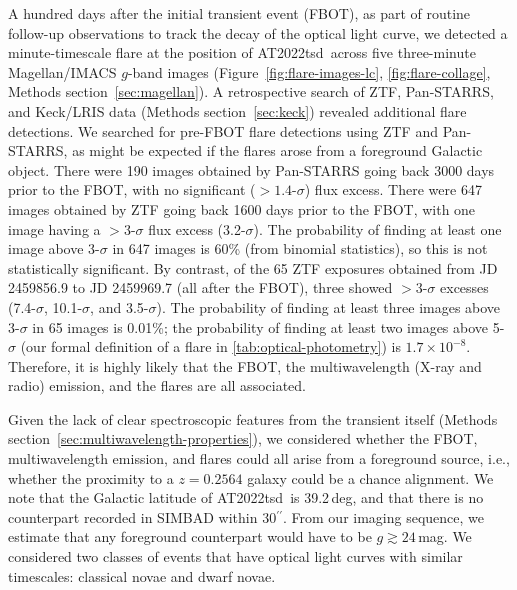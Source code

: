 \documentclass{nature_plusfigure}
\newcommand{\at}{AT2022tsd}
\newcommand{\arcsec}{$^{\prime\prime}$}
\begin{document}
\begin{methods}
A hundred days after the initial transient event (FBOT), as part of routine follow-up observations to track the decay of the optical light curve, we detected\cite{Ho2022_Flares} a minute-timescale flare at the position of \at\ across five three-minute Magellan/IMACS $g$-band images (Figure~\ref{fig:flare-images-lc}, \ref{fig:flare-collage}, Methods section~\ref{sec:magellan}). A retrospective search of ZTF, Pan-STARRS, and Keck/LRIS data (Methods section~\ref{sec:keck}) revealed additional flare detections. We searched for pre-FBOT flare detections using ZTF and Pan-STARRS, as might be expected if the flares arose from a foreground Galactic object. There were 190 images obtained by Pan-STARRS going back 3000 days prior to the FBOT, with no significant ($>1.4$-$\sigma$) flux excess\cite{Fulton2022}. There were 647 images obtained by ZTF going back 1600 days prior to the FBOT, with one image having a $>3$-$\sigma$ flux excess (3.2-$\sigma$). The probability of finding at least one image above 3-$\sigma$ in 647 images is 60\% (from binomial statistics), so this is not statistically significant. By contrast, of the 65 ZTF exposures obtained from JD 2459856.9 to JD 2459969.7 (all after the FBOT), three showed $>3$-$\sigma$ excesses (7.4-$\sigma$, 10.1-$\sigma$, and 3.5-$\sigma$). The probability of finding at least three images above 3-$\sigma$ in 65 images is 0.01\%; the probability of finding at least two images above 5-$\sigma$ (our formal definition of a flare in \ref{tab:optical-photometry}) is $1.7\times10^{-8}$. Therefore, it is highly likely that the FBOT, the multiwavelength (X-ray and radio) emission, and the flares are all associated. 


Given the lack of clear spectroscopic features from the transient itself (Methods section~\ref{sec:multiwavelength-properties}), we considered whether the FBOT, multiwavelength emission, and flares could all arise from a foreground source, i.e., whether the proximity to a $z=0.2564$ galaxy could be a chance alignment. 
We note that the Galactic latitude of \at\ is 39.2\,deg, and that there is no counterpart recorded in SIMBAD within 30\arcsec. From our imaging sequence, we estimate that any foreground counterpart would have to be $g \gtrsim 24\,$mag. We considered two classes of events that have optical light curves with similar timescales: classical novae and dwarf novae.


\end{methods}
\end{document}
